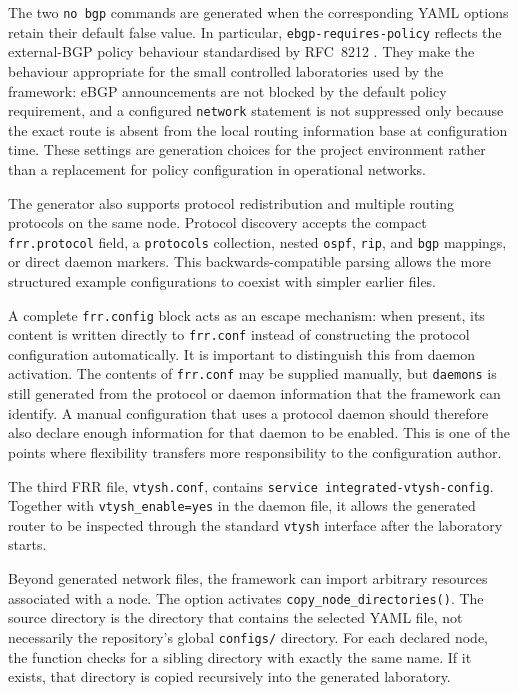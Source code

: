 The two \texttt{no bgp} commands are generated when the corresponding YAML
options retain their default false value. In particular,
\texttt{ebgp-requires-policy} reflects the external-BGP policy behaviour
standardised by RFC~8212 \cite{rfc8212}. They make the behaviour appropriate
for the small controlled laboratories used by the framework: eBGP announcements
are not blocked by the default policy requirement, and a configured
\texttt{network} statement is not suppressed only because the exact route is
absent from the local routing information base at configuration time. These
settings are generation choices for the project environment rather than a
replacement for policy configuration in operational networks.

The generator also supports protocol redistribution and multiple routing
protocols on the same node. Protocol discovery accepts the compact
\texttt{frr.protocol} field, a \texttt{protocols} collection, nested
\texttt{ospf}, \texttt{rip}, and \texttt{bgp} mappings, or direct daemon
markers. This backwards-compatible parsing allows the more structured example
configurations to coexist with simpler earlier files.

A complete \texttt{frr.config} block acts as an escape mechanism: when present,
its content is written directly to \texttt{frr.conf} instead of constructing
the protocol configuration automatically. It is important to distinguish this
from daemon activation. The contents of \texttt{frr.conf} may be supplied
manually, but \texttt{daemons} is still generated from the protocol or daemon
information that the framework can identify. A manual configuration that uses
a protocol daemon should therefore also declare enough information for that
daemon to be enabled. This is one of the points where flexibility transfers
more responsibility to the configuration author.

The third FRR file, \texttt{vtysh.conf}, contains
\texttt{service integrated-vtysh-config}. Together with
\texttt{vtysh\_enable=yes} in the daemon file, it allows the generated router to
be inspected through the standard \texttt{vtysh} interface after the
laboratory starts.

Beyond generated network files, the framework can import arbitrary resources
associated with a node. The option  activates
\texttt{copy\_node\_directories()}. The source directory is the directory that
contains the selected YAML file, not necessarily the repository's global
\texttt{configs/} directory. For each declared node, the function checks for a
sibling directory with exactly the same name. If it exists, that directory is
copied recursively into the generated laboratory.

